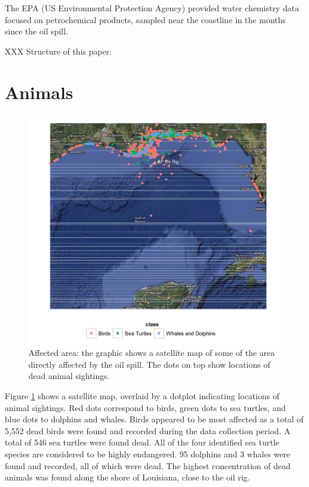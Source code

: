 \documentclass[11pt]{article}
\begin{document}
The EPA (US Environmental  Protection Agency) provided water chemistry data focused on petrochemical products, sampled near the coastline in the months since the oil spill. 


XXX Structure of this paper:
\section{Animals}

\begin{figure}[htbp] %
   \centering
   \includegraphics[width=5in]{animal_deaths.png} 
   \caption{Affected area: the graphic shows a satellite map of some of the area directly affected by the oil spill. The dots on top show locations of dead animal sightings. }
   \label{deaths}
\end{figure}
Figure \ref{deaths} shows a satellite map, overlaid by a dotplot indicating locations of animal sightings. Red dots correspond to birds, green dots to sea turtles, and blue dots to dolphins and whales.  Birds appeared to be most affected as a total of 5,552 dead birds were found and recorded during the data collection period.  A total of 546 sea turtles were found dead.  All of the four identified sea turtle species are considered to be highly endangered.  95 dolphins and 3 whales were found and recorded, all of which were dead. The highest concentration of dead animals was found along the shore of Louisiana, close to the oil rig.  
\end{document}
